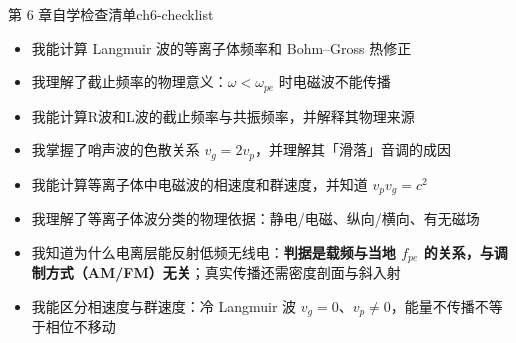 \enlargethispage{2\baselineskip}
\begin{checklistbox}{第 6 章自学检查清单}{ch6-checklist}
\begin{itemize}[leftmargin=*,label=$\square$]
\item 我能计算 Langmuir 波的等离子体频率和 Bohm--Gross 热修正
\item 我理解了截止频率的物理意义：$\omega < \omega_{pe}$ 时电磁波不能传播
\item 我能计算R波和L波的截止频率与共振频率，并解释其物理来源
\item 我掌握了哨声波的色散关系 $v_g = 2v_p$，并理解其「滑落」音调的成因
\item 我能计算等离子体中电磁波的相速度和群速度，并知道 $v_p v_g = c^2$
\item 我理解了等离子体波分类的物理依据：静电/电磁、纵向/横向、有无磁场
\item 我知道为什么电离层能反射低频无线电：\textbf{判据是载频与当地 $f_{pe}$ 的关系，与调制方式（AM/FM）无关}；真实传播还需密度剖面与斜入射
\item 我能区分相速度与群速度：冷 Langmuir 波 $v_g=0$、$v_p\neq0$，能量不传播不等于相位不移动
\end{itemize}
\end{checklistbox}


\endinput
